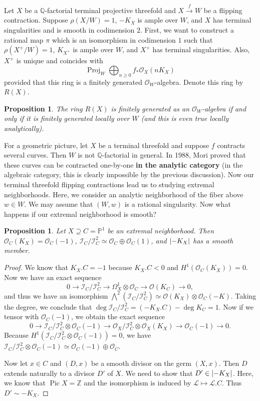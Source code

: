 \documentclass[leqno, openany]{memoir}
\newtheorem{prop}[thm]{Proposition}
\theoremstyle{definition}
\theoremstyle{remark}
\theoremstyle{plain}
\theoremstyle{definition}
\theoremstyle{remark}
\newcommand{\Z}{\mathbb{Z}}
\newcommand{\Q}{\mathbb{Q}}
\renewcommand{\P}{\mathbb{P}}
\newcommand{\msc}[1]{\mathscr{#1}}
\DeclareMathOperator{\Pic}{Pic}
\DeclareMathOperator{\Proj}{Proj}
\begin{document}
Let $X$ be a $\Q$-factorial terminal projective threefold and $X \xrightarrow{f} W$ be a flipping contraction. Suppose $\rho(X/W) = 1$, $-K_X$ is ample over $W$, and $X$ has terminal singularities and is smooth in codimension $2$. First, we want to construct a rational map $\pi$ which is an isomorphism in codimension $1$ such that $\rho(X^+/W) = 1$, $K_{X^+}$ is ample over $W$, and $X^+$ has terminal singularities. Also, $X^+$ is unique and coincides with
\[ \Proj_W \bigoplus_{n \geq 0} f_* \msc{O}_X(nK_X) \]
provided that this ring is a finitely generated $\msc{O}_W$-algebra. Denote this ring by $R(X)$.

\begin{prop}
    The ring $R(X)$ is finitely generated as an $\msc{O}_W$-algebra if and only if it is finitely generated locally over $W$ (and this is even true locally analytically).
\end{prop}

For a geometric picture, let $X$ be a terminal threefold and suppose $f$ contracts several curves. Then $W$ is not $\Q$-factorial in general. In 1988, Mori proved that these curves can be contracted one-by-one \textbf{in the analytic category} (in the algebraic category, this is clearly impossible by the previous discussion). Now our terminal threefold flipping contractions lead us to studying extremal neighborhoods. Here, we consider an analytic neighborhood of the fiber above $w \in W$. We may assume that $(W, w)$ is a rational singularity. Now what happens if our extremal neighborhood is smooth?

\begin{prop}
    Let $X \supseteq C = \P^1$ be an extremal neighborhood. Then $\msc{O}_C(K_X) = \msc{O}_C(-1)$, $\msc{I}_C / \msc{I}_C^2 \simeq \msc{O}_C \oplus \msc{O}_C(1)$, and $\abs{-K_X}$ has a smooth member.
\end{prop}

\begin{proof}
    We know that $K_X. C = -1$ because $K_X. C < 0$ and $H^1(\msc{O}_C(K_X)) = 0$. Now we have an exact sequence
    \[ 0 \to \msc{I}_C/\msc{I}_C^2 \to \Omega^1_X \otimes \msc{O}_C \to \msc{O}(K_C) \to 0, \]
    and thus we have an isomorphism $\bigwedge^2(\msc{I}_C/\msc{I}_C^2) \simeq \msc{O}(K_X) \otimes \msc{O}_C(-K)$. Taking the degree, we conclude that $\deg \msc{I}_C / \msc{I}_C^2 = (-K_X.C) - \deg K_C = 1$. Now if we tensor with $\msc{O}_C(-1)$, we obtain the exact sequence
    \[ 0 \to \msc{I}_C/\msc{I}_C^2 \otimes \msc{O}_C(-1) \to \msc{O}_X / \msc{I}_C^2 \otimes \msc{O}_X(K_X) \to \msc{O}_C(-1) \to 0. \]
    Because $H^1(\msc{I}_C / \msc{I}_C^2 \otimes \msc{O}_C(-1)) = 0$, we have $\msc{I}_C / \msc{I}_C^2 \otimes \msc{O}_C(-1) \simeq \msc{O}_C(-1) \oplus \msc{O}_C$.

    Now let $x \in C$ and $(D, x)$ be a smooth divisor on the germ $(X, x)$. Then $D$ extends naturally to a divisor $D'$ of $X$. We need to show that $D' \in \abs{-K_X}$. Here, we know that $\Pic X = \Z$ and the isomorphism is induced by $\msc{L} \mapsto \msc{L}.C$. Thus $D' \sim -K_X$.
\end{proof}
\end{document}
